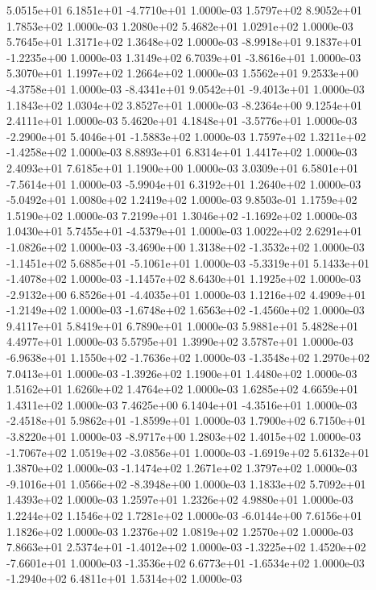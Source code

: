  5.0515e+01  6.1851e+01 -4.7710e+01  1.0000e-03
1.5797e+02 8.9052e+01 1.7853e+02  1.0000e-03
1.2080e+02 5.4682e+01 1.0291e+02  1.0000e-03
5.7645e+01 1.3171e+02 1.3648e+02  1.0000e-03
-8.9918e+01  9.1837e+01 -1.2235e+00  1.0000e-03
 1.3149e+02  6.7039e+01 -3.8616e+01  1.0000e-03
5.3070e+01 1.1997e+02 1.2664e+02  1.0000e-03
 1.5562e+01  9.2533e+00 -4.3758e+01  1.0000e-03
-8.4341e+01  9.0542e+01 -9.4013e+01  1.0000e-03
1.1843e+02 1.0304e+02 3.8527e+01  1.0000e-03
-8.2364e+00  9.1254e+01  2.4111e+01  1.0000e-03
 5.4620e+01  4.1848e+01 -3.5776e+01  1.0000e-03
-2.2900e+01  5.4046e+01 -1.5883e+02  1.0000e-03
 1.7597e+02  1.3211e+02 -1.4258e+02  1.0000e-03
8.8893e+01 6.8314e+01 1.4417e+02  1.0000e-03
2.4093e+01 7.6185e+01 1.1900e+00  1.0000e-03
 3.0309e+01  6.5801e+01 -7.5614e+01  1.0000e-03
-5.9904e+01  6.3192e+01  1.2640e+02  1.0000e-03
-5.0492e+01  1.0080e+02  1.2419e+02  1.0000e-03
9.8503e-01 1.1759e+02 1.5190e+02  1.0000e-03
 7.2199e+01  1.3046e+02 -1.1692e+02  1.0000e-03
 1.0430e+01  5.7455e+01 -4.5379e+01  1.0000e-03
 1.0022e+02  2.6291e+01 -1.0826e+02  1.0000e-03
-3.4690e+00  1.3138e+02 -1.3532e+02  1.0000e-03
-1.1451e+02  5.6885e+01 -5.1061e+01  1.0000e-03
-5.3319e+01  5.1433e+01 -1.4078e+02  1.0000e-03
-1.1457e+02  8.6430e+01  1.1925e+02  1.0000e-03
-2.9132e+00  6.8526e+01 -4.4035e+01  1.0000e-03
 1.1216e+02  4.4909e+01 -1.2149e+02  1.0000e-03
-1.6748e+02  1.6563e+02 -1.4560e+02  1.0000e-03
9.4117e+01 5.8419e+01 6.7890e+01  1.0000e-03
5.9881e+01 5.4828e+01 4.4977e+01  1.0000e-03
5.5795e+01 1.3990e+02 3.5787e+01  1.0000e-03
-6.9638e+01  1.1550e+02 -1.7636e+02  1.0000e-03
-1.3548e+02  1.2970e+02  7.0413e+01  1.0000e-03
-1.3926e+02  1.1900e+01  1.4480e+02  1.0000e-03
1.5162e+01 1.6260e+02 1.4764e+02  1.0000e-03
1.6285e+02 4.6659e+01 1.4311e+02  1.0000e-03
 7.4625e+00  6.1404e+01 -4.3516e+01  1.0000e-03
-2.4518e+01  5.9862e+01 -1.8599e+01  1.0000e-03
 1.7900e+02  6.7150e+01 -3.8220e+01  1.0000e-03
-8.9717e+00  1.2803e+02  1.4015e+02  1.0000e-03
-1.7067e+02  1.0519e+02 -3.0856e+01  1.0000e-03
-1.6919e+02  5.6132e+01  1.3870e+02  1.0000e-03
-1.1474e+02  1.2671e+02  1.3797e+02  1.0000e-03
-9.1016e+01  1.0566e+02 -8.3948e+00  1.0000e-03
1.1833e+02 5.7092e+01 1.4393e+02  1.0000e-03
1.2597e+01 1.2326e+02 4.9880e+01  1.0000e-03
1.2244e+02 1.1546e+02 1.7281e+02  1.0000e-03
-6.0144e+00  7.6156e+01  1.1826e+02  1.0000e-03
1.2376e+02 1.0819e+02 1.2570e+02  1.0000e-03
 7.8663e+01  2.5374e+01 -1.4012e+02  1.0000e-03
-1.3225e+02  1.4520e+02 -7.6601e+01  1.0000e-03
-1.3536e+02  6.6773e+01 -1.6534e+02  1.0000e-03
-1.2940e+02  6.4811e+01  1.5314e+02  1.0000e-03

